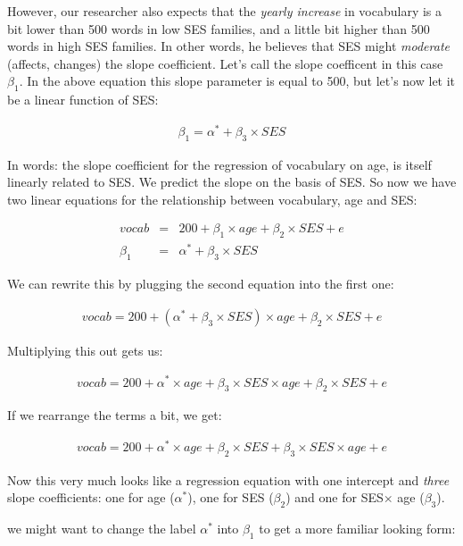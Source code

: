 \documentclass[]{report}\usepackage[]{graphicx}\usepackage[]{color}
\begin{document}
However, our researcher also expects that the \textit{yearly increase} in vocabulary is a bit lower than 500 words in low SES families, and a little bit higher than 500 words in high SES families. In other words, he believes that SES might \textit{moderate} (affects, changes) the slope coefficient. Let's call the slope coefficent in this case $\beta_1$. In the above equation this slope parameter is equal to 500, but let's now let it be a linear function of SES:

\begin{eqnarray}
\beta_1 = \alpha^* + \beta_3 \times SES 
\end{eqnarray}

In words: the slope coefficient for the regression of vocabulary on age, is itself linearly related to SES. We predict the slope on the basis of SES. So now we have two linear equations for the relationship between vocabulary, age and SES:

\begin{eqnarray}
vocab &=& 200 + \beta_1 \times age + \beta_2 \times SES + e \\
\beta_1 &=& \alpha^* + \beta_3 \times SES 
\end{eqnarray}

We can rewrite this by plugging the second equation into the first one:

\begin{eqnarray}
vocab = 200 + (\alpha^* + \beta_3 \times SES)  \times age + \beta_2 \times SES + e
\end{eqnarray}


Multiplying this out gets us:

\begin{eqnarray} 
vocab = 200 + \alpha^* \times age + \beta_3 \times SES  \times age + \beta_2 \times SES + e
\end{eqnarray}

If we rearrange the terms a bit, we get:

\begin{eqnarray} 
vocab = 200 + \alpha^* \times age + \beta_2 \times SES + \beta_3 \times SES  \times age + e
\end{eqnarray}

Now this very much looks like a regression equation with one intercept and \textit{three} slope coefficients: one for age ($\alpha^*$), one for SES ($\beta_2$) and one for SES$\times$ age ($\beta_3$).


we might want to change the label $\alpha^*$ into $\beta_1$ to get a more familiar looking form:
\end{document}
